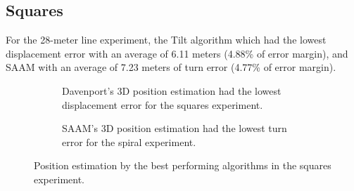 \newpage

\subsection{Squares}

For the 28-meter line experiment, the Tilt algorithm which had the lowest displacement error with an average of 6.11 meters (4.88\% of error margin), and SAAM with an average of 7.23 meters of turn error (4.77\% of error margin).

\vspace{-0.5cm}

\vspace{-1.5cm}

\begin{figure}[H]
    \centering
    \begin{subfigure}{0.49\textwidth}
        \centering
        \resizebox{1\linewidth}{!}{}
        \caption{Davenport's 3D position estimation had the lowest displacement error for the squares experiment.}
        \label{fig:squares2D}
    \end{subfigure}
    \begin{subfigure}{0.49\textwidth}
        \centering
        \resizebox{1\linewidth}{!}{}
        \caption{SAAM's 3D position estimation had the lowest turn error for the spiral experiment.}
        \label{fig:squares3D}
    \end{subfigure}
    \caption{Position estimation by the best performing algorithms in the squares experiment.}
    \label{fig:squares}
\end{figure}
